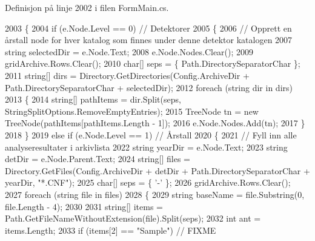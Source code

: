 Definisjon på linje 2002 i filen Form\+Main.\+cs.


\begin{DoxyCode}
2003         \{
2004             \textcolor{keywordflow}{if} (e.Node.Level == 0) \textcolor{comment}{// Detektorer}
2005             \{
2006                 \textcolor{comment}{// Opprett en årstall node for hver katalog som finnes under denne detektor katalogen}
2007                 \textcolor{keywordtype}{string} selectedDir = e.Node.Text;
2008                 e.Node.Nodes.Clear();
2009                 gridArchive.Rows.Clear();
2010                 \textcolor{keywordtype}{char}[] seps = \{ Path.DirectorySeparatorChar \};
2011                 \textcolor{keywordtype}{string}[] dirs = Directory.GetDirectories(Config.ArchiveDir + Path.DirectorySeparatorChar + 
      selectedDir);
2012                 \textcolor{keywordflow}{foreach} (\textcolor{keywordtype}{string} dir \textcolor{keywordflow}{in} dirs)
2013                 \{
2014                     \textcolor{keywordtype}{string}[] pathItems = dir.Split(seps, StringSplitOptions.RemoveEmptyEntries);
2015                     TreeNode tn = \textcolor{keyword}{new} TreeNode(pathItems[pathItems.Length - 1]);
2016                     e.Node.Nodes.Add(tn);
2017                 \}
2018             \}
2019             \textcolor{keywordflow}{else} \textcolor{keywordflow}{if} (e.Node.Level == 1) \textcolor{comment}{// Årstall}
2020             \{
2021                 \textcolor{comment}{// Fyll inn alle analyseresultater i arkivlista}
2022                 \textcolor{keywordtype}{string} yearDir = e.Node.Text;
2023                 \textcolor{keywordtype}{string} detDir = e.Node.Parent.Text;
2024                 \textcolor{keywordtype}{string}[] files = Directory.GetFiles(Config.ArchiveDir + detDir + 
      Path.DirectorySeparatorChar + yearDir, \textcolor{stringliteral}{"*.CNF"});
2025                 \textcolor{keywordtype}{char}[] seps = \{ \textcolor{charliteral}{'-'} \};
2026                 gridArchive.Rows.Clear();
2027                 \textcolor{keywordflow}{foreach} (\textcolor{keywordtype}{string} file \textcolor{keywordflow}{in} files)
2028                 \{
2029                     \textcolor{keywordtype}{string} baseName = file.Substring(0, file.Length - 4);
2030 
2031                     \textcolor{keywordtype}{string}[] items = Path.GetFileNameWithoutExtension(file).Split(seps);
2032                     \textcolor{keywordtype}{int} ant = items.Length;
2033                     \textcolor{keywordflow}{if} (items[2] == \textcolor{stringliteral}{"Sample"}) \textcolor{comment}{// FIXME}

\end{DoxyCode}
